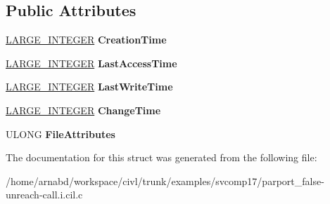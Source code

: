 \subsection*{Public Attributes}
\begin{DoxyCompactItemize}
\item 
\hypertarget{struct__FILE__BASIC__INFORMATION_a3248793065da195cfb8943906d5c4174}{}\hyperlink{union__LARGE__INTEGER}{L\+A\+R\+G\+E\+\_\+\+I\+N\+T\+E\+G\+E\+R} {\bfseries Creation\+Time}\label{struct__FILE__BASIC__INFORMATION_a3248793065da195cfb8943906d5c4174}

\item 
\hypertarget{struct__FILE__BASIC__INFORMATION_afa5726e7e88e909249a222d1992d9666}{}\hyperlink{union__LARGE__INTEGER}{L\+A\+R\+G\+E\+\_\+\+I\+N\+T\+E\+G\+E\+R} {\bfseries Last\+Access\+Time}\label{struct__FILE__BASIC__INFORMATION_afa5726e7e88e909249a222d1992d9666}

\item 
\hypertarget{struct__FILE__BASIC__INFORMATION_a2e68af7bccc7317606ca0bb3cc0b8db1}{}\hyperlink{union__LARGE__INTEGER}{L\+A\+R\+G\+E\+\_\+\+I\+N\+T\+E\+G\+E\+R} {\bfseries Last\+Write\+Time}\label{struct__FILE__BASIC__INFORMATION_a2e68af7bccc7317606ca0bb3cc0b8db1}

\item 
\hypertarget{struct__FILE__BASIC__INFORMATION_a3f3cbc57ec45b93ce1d5afedc436d6e2}{}\hyperlink{union__LARGE__INTEGER}{L\+A\+R\+G\+E\+\_\+\+I\+N\+T\+E\+G\+E\+R} {\bfseries Change\+Time}\label{struct__FILE__BASIC__INFORMATION_a3f3cbc57ec45b93ce1d5afedc436d6e2}

\item 
\hypertarget{struct__FILE__BASIC__INFORMATION_a9f3f9218a9376406878eeee19bf2bfa2}{}U\+L\+O\+N\+G {\bfseries File\+Attributes}\label{struct__FILE__BASIC__INFORMATION_a9f3f9218a9376406878eeee19bf2bfa2}

\end{DoxyCompactItemize}


The documentation for this struct was generated from the following file\+:\begin{DoxyCompactItemize}
\item 
/home/arnabd/workspace/civl/trunk/examples/svcomp17/parport\+\_\+false-\/unreach-\/call.\+i.\+cil.\+c\end{DoxyCompactItemize}
